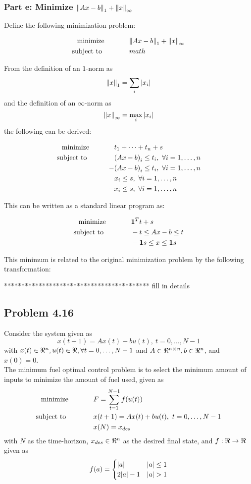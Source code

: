 \documentclass[letter]{article}
\newcommand{\optpblm}[3][eq:default]{
	\begin{equation}\label{#1}
		\begin{aligned}
			\text{minimize} \hspace{0.5in} &#2\vspace{5pt}\\
			\text{subject to \hspace{0.5in}} &#3
		\end{aligned}	
	\end{equation}
}
\begin{document}
\subsubsection{Part e: Minimize $\norm{Ax-b}_1 + \norm{x}_\infty$}
Define the following minimization problem:
\optpblm{\norm{Ax-b}_1 + \norm{x}_\infty}{math}
From the definition of an $1$-norm as $$\norm{x}_1 = \sum_i \abs{x_i}$$ and the definition of an $\infty$-norm as $$\norm{x}_\infty = \max_i \abs{x_i}$$ the following can be derived:
\optpblm{t_1 + \cdots + t_n + s}{
		\qty(Ax - b)_i\leq t_i, \ \forall i = 1,\dots,n\\
		-& \qty(Ax - b)_i\leq t_i, \ \forall i = 1,\dots,n\\
		&x_i \leq s, \ \forall i = 1,\dots,n\\
	-	&x_i \leq s, \ \forall i = 1,\dots,n}
This can be written as a standard linear program as:
\optpblm{\vb{1}^T t + s}{
		- t \leq Ax-b \leq t\\
		&-\vb{1}s \leq x \leq \vb{1}s}
This minimum is related to the original minimization problem by the following transformation:

****************************************** fill in details

\newpage
\subsection{Problem 4.16}
Consider the system given as
\begin{equation}\label{eq:dyn_sys_def}
	x(t+1) = A x(t) + b u(t), \ t = 0,\dots,N-1
\end{equation}
with $x(t) \in \real^n, u(t) \in \real, \forall t = 0,\dots,N-1$ and $A \in \real^{n\cross n}, b \in \real^n$, and $x(0) = 0$.\\

The minimum fuel optimal control problem is to select the minimum amount of inputs to minimize the amount of fuel used, given as
\begin{equation}\label{eq:min_fuel_problem_def}
	\begin{aligned}
		\text{minimize} \hspace{0.5in} &F = \sum_{t=1}^{N-1} f(u(t))\\
		\text{subject to \hspace{0.5in}} & x(t+1) = A x(t) + b u(t), \ t = 0,\dots,N-1\\
		& x(N) = x_{des}
	\end{aligned}	
\end{equation}
with $N$ as the time-horizon, $x_{des} \in \real^n$ as the desired final state, and $f: \real \to \real$ given as
\begin{equation}\label{eq:fuel_usage_def}
	f(a) = 
	\begin{cases}
		\abs{a} & \abs{a} \leq 1 \\
		2 \abs{a} - 1 & \abs{a} > 1
	\end{cases}
\end{equation}
\end{document}
